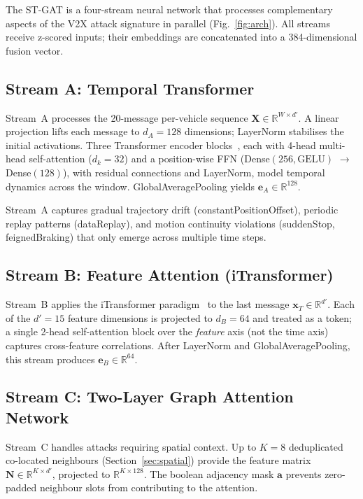 \documentclass[conference]{IEEEtran}
\begin{document}
The ST-GAT is a four-stream neural network that processes complementary
aspects of the V2X attack signature in parallel (Fig.~\ref{fig:arch}).
All streams receive z-scored inputs; their embeddings are concatenated
into a 384-dimensional fusion vector.

\subsection{Stream A: Temporal Transformer}

Stream~A processes the 20-message per-vehicle sequence
$\mathbf{X} \in \mathbb{R}^{W \times d'}$.  A linear projection lifts
each message to $d_A=128$ dimensions; LayerNorm stabilises the initial
activations.  Three Transformer encoder blocks~\cite{vaswani2017attention},
each with 4-head multi-head self-attention
($d_k = 32$) and a position-wise FFN (Dense$(256,\text{GELU})$ $\to$
Dense$(128)$), with residual connections and LayerNorm, model temporal
dynamics across the window.  GlobalAveragePooling yields
$\mathbf{e}_A \in \mathbb{R}^{128}$.

Stream~A captures gradual trajectory drift (constantPositionOffset),
periodic replay patterns (dataReplay), and motion continuity violations
(suddenStop, feignedBraking) that only emerge across multiple time steps.

\subsection{Stream B: Feature Attention (iTransformer)}

Stream~B applies the iTransformer paradigm~\cite{itransformer2024} to the
last message $\mathbf{x}_T \in \mathbb{R}^{d'}$.  Each of the $d'=15$
feature dimensions is projected to $d_B=64$ and treated as a token;
a single 2-head self-attention block over the \emph{feature} axis
(not the time axis) captures cross-feature correlations.  After LayerNorm
and GlobalAveragePooling, this stream produces
$\mathbf{e}_B \in \mathbb{R}^{64}$.

\subsection{Stream C: Two-Layer Graph Attention Network}
\label{sec:streamC}

Stream~C handles attacks requiring spatial context.  Up to $K=8$
deduplicated co-located neighbours (Section~\ref{sec:spatial}) provide
the feature matrix $\mathbf{N} \in \mathbb{R}^{K \times d'}$, projected to
$\mathbb{R}^{K \times 128}$.  The boolean adjacency mask $\mathbf{a}$
prevents zero-padded neighbour slots from contributing to the attention.
\end{document}
